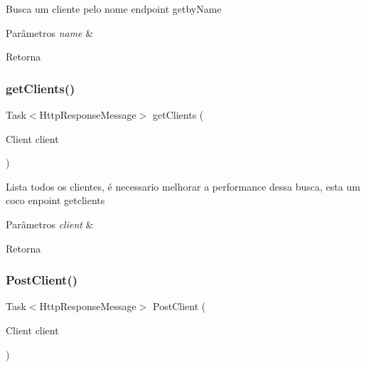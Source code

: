 Busca um cliente pelo nome endpoint getby\+Name 


\begin{DoxyParams}{Parâmetros}
{\em name} & \\
\hline
\end{DoxyParams}
\begin{DoxyReturn}{Retorna}

\end{DoxyReturn}
\mbox{\label{classApi3Layers_1_1Controllers_1_1ClientController_acd6322615b0779aafdbef5f44517f329}} 
\subsubsection{\texorpdfstring{get\+Clients()}{getClients()}}
{\footnotesize\ttfamily Task$<$Http\+Response\+Message$>$ get\+Clients (\begin{DoxyParamCaption}\item[{Client}]{client }\end{DoxyParamCaption})}



Lista todos os clientes, é necessario melhorar a performance dessa busca, esta um coco enpoint getclients 


\begin{DoxyParams}{Parâmetros}
{\em client} & \\
\hline
\end{DoxyParams}
\begin{DoxyReturn}{Retorna}

\end{DoxyReturn}
\mbox{\label{classApi3Layers_1_1Controllers_1_1ClientController_a05f7ee98b8ff74ab142860e21b1f8350}} 
\subsubsection{\texorpdfstring{Post\+Client()}{PostClient()}}
{\footnotesize\ttfamily Task$<$Http\+Response\+Message$>$ Post\+Client (\begin{DoxyParamCaption}\item[{Client}]{client }\end{DoxyParamCaption})}




